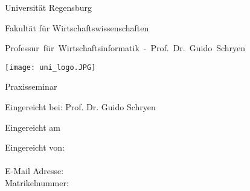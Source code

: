 %
%
%

\thispagestyle{empty}
\begin{titlepage}


\begin{adjustwidth}{-2cm}{}


\renewcommand{\thepage}{}

\begin{center}

\large{Universität Regensburg\\}

\large{Fakultät für Wirtschaftswissenschaften\\}

\large{\mbox{Professur für Wirtschaftsinformatik - Prof. Dr. Guido Schryen}}

\vspace*{10mm}

\Large{\textbf{\titelthema}}

\vspace*{15mm}
\texttt{[image: uni\_logo.JPG]}
\vspace*{15mm}

\Large{Praxisseminar}

\vspace*{10mm}



\Large{Eingereicht bei: Prof. Dr. Guido Schryen\\}


\vspace*{5mm}

\large{Eingereicht am \abgabedatum\\}

\end{center}

\vfill

\begin{center}
\end{center}
\vspace*{6mm}
\begin{flushleft}
Eingereicht von:\\
\vspace*{7pt}
\authorname\\
E-Mail Adresse: \authormail\\
Matrikelnummer: \matrikelnr\\




\end{flushleft}

\end{adjustwidth}

\end{titlepage}

\newpage

